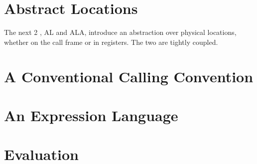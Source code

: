 \documentclass[main.tex]{subfiles}
\begin{document}
\section{Abstract Locations}
The next 2 \ils{}, AL and ALA, introduce an abstraction over physical locations, whether on the call frame or in registers. The two \ils{} are tightly coupled.


\section{A Conventional Calling Convention}

\section{An Expression Language}

\section{Evaluation}

\biblio{}
\onlyinsubfile{\glsaddall\printglossaries}
\end{document}
